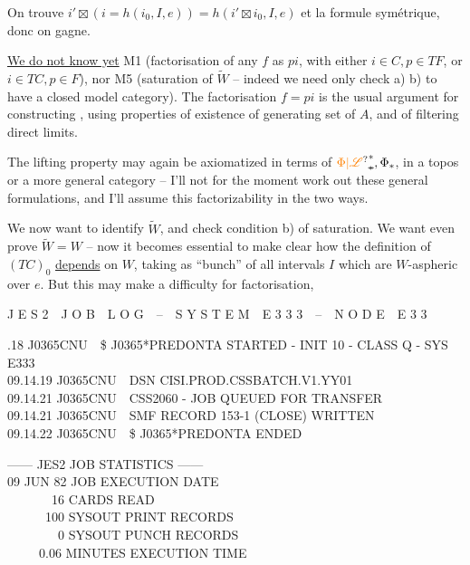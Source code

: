 
On trouve $i'\boxtimes(i=h(i_0,I,e))=h(i'\boxtimes i_0,I,e)$ et la formule symétrique, donc on gagne.


\uline{We do not know yet} M1 (factorisation of any $f$ as $pi$, with either $i\in C,p\in TF$, or $i\in TC,p\in F$), nor M5 (saturation of $\widetilde W$ -- indeed we need only check a) b) to have a closed model category). The factorisation $f=pi$ is the usual argument for constructing , using  properties of existence of  generating set of $A$, and of filtering direct limits.

The lifting property may again be axiomatized in terms of $\unsure{\Phi|\mathscr L}^{*}_{\deleted{*}},\Phi_{*}$, in a topos or a more general category -- I'll not for the moment work out these general formulations, and  I'll assume this factorizability  in the two ways.


We now want to identify $\widetilde W$, and check condition b) of saturation. We want even prove $\widetilde W=W$ -- now it becomes essential to  make clear how the definition of $(TC)_0$ \uline{depends} on $W$, taking as ``bunch'' of  all intervals $I$ which are $W$-aspheric over $e$. But this may make a difficulty for factorisation,


{\scriptsize\ttfamily J E S 2~~J O B~~L O G~~--~~S Y S T E M~~E 3 3 3~~--~~N O D E~~E 3 3}

{\scriptsize{}.18 J0365CNU~~\$ J0365*PREDONTA STARTED - INIT 10 - CLASS Q - SYS E333\\
09.14.19 J0365CNU~~DSN CISI.PROD.CSSBATCH.V1.YY01\\
09.14.21 J0365CNU~~CSS2060 - JOB QUEUED FOR TRANSFER\\
09.14.21 J0365CNU~~SMF RECORD 153-1 (CLOSE) WRITTEN\\
09.14.22 J0365CNU~~\$ J0365*PREDONTA ENDED}

{\scriptsize\ttfamily ------ JES2 JOB STATISTICS ------\\[1em]
09 JUN 82 JOB EXECUTION DATE\\[1em]
~~~~~~~16 CARDS READ\\[1em]
~~~~~~100 SYSOUT PRINT RECORDS\\[1em]
~~~~~~~~0 SYSOUT PUNCH RECORDS\\[1em]
~~~~~0.06 MINUTES EXECUTION TIME}

